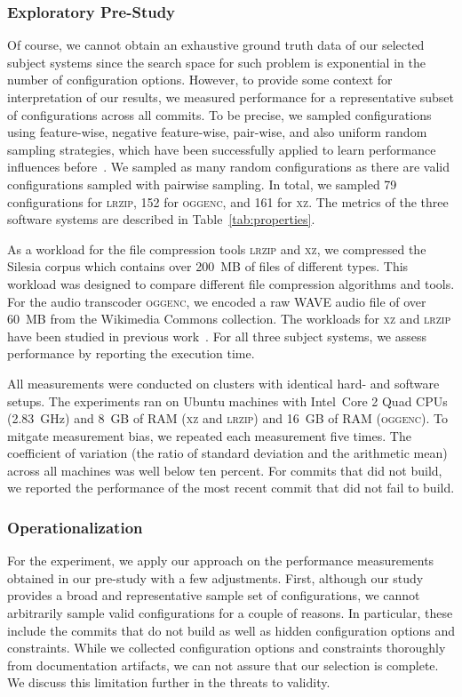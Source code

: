\documentclass[sigconf]{acmart}
\begin{document}
	\subsubsection{Exploratory Pre-Study}
	Of course, we cannot obtain an exhaustive ground truth data of our selected subject systems since the search space for such problem is exponential in the number of configuration options. 
	However, to provide some context for interpretation of our results, we measured performance for a representative subset of configurations across all commits. To be precise, we sampled configurations using feature-wise, negative feature-wise, pair-wise, and also uniform random sampling strategies, which have been successfully applied to learn performance influences before~\cite{alves_sampling_2020}. We sampled as many random configurations as there are valid configurations sampled with pairwise sampling. In total, we sampled 79 configurations for \textsc{lrzip}, 152 for \textsc{oggenc}, and 161 for \textsc{xz}. The metrics of the three software systems are described in Table~\ref{tab:properties}.
	
	As a workload for the file compression tools \textsc{lrzip} and \textsc{xz}, we compressed the Silesia corpus which contains over 200~MB of files of different types.  This workload was designed to compare different file compression algorithms and tools. For the audio transcoder \textsc{oggenc}, we encoded a raw WAVE audio file of over 60~MB from the Wikimedia Commons collection.  The workloads for \textsc{xz} and \textsc{lrzip} have been studied in previous work~\cite{siegmund_views_2015,muhlbauer_accurate_2019}. For all three subject systems, we assess performance by reporting the execution time.
	
	All measurements were conducted on clusters with identical hard- and software setups. The experiments ran on Ubuntu machines with Intel~Core
	2 Quad CPUs (2.83~GHz) and 8~GB of RAM (\textsc{xz} and \textsc{lrzip}) and 16~GB of RAM (\textsc{oggenc}). To mitgate measurement bias, we repeated each measurement five times. The coefficient of variation (the ratio of standard deviation and the arithmetic mean) across all machines was well below ten percent. For commits that did not build, we reported the performance of the most recent commit that did not fail to build.
	
	\subsubsection{Operationalization}\label{sec:rq2_operationalization}
	For the experiment, we apply our approach on the performance measurements obtained in our pre-study with a few adjustments.
	First, although our study provides a broad and representative sample set of configurations, we cannot arbitrarily sample valid configurations for a couple of reasons. In particular, these include the commits that do not build as well as hidden configuration options and constraints. While we collected configuration options and constraints thoroughly from documentation artifacts, we can not assure that our selection is complete. We discuss this limitation further in the threats to validity.
	
\end{document}
